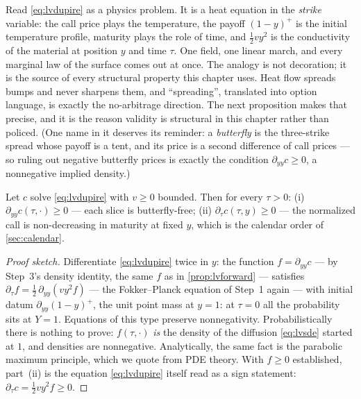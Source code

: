 Read \eqref{eq:lvdupire} as a physics problem.  It is a heat equation
in the \emph{strike} variable: the call price plays the temperature,
the payoff $(1-y)^{+}$ is the initial temperature profile, maturity
plays the role of time, and $\tfrac12 v y^{2}$ is the conductivity of
the material at position $y$ and time $\tau$.  One field, one linear
march, and every marginal law of the surface comes out at once.  The
analogy is not decoration; it is the source of every structural
property this chapter uses.  Heat flow spreads bumps and never sharpens
them, and ``spreading'', translated into option language, is exactly
the no-arbitrage direction.  The next proposition makes that precise,
and it is the reason validity is structural in this chapter rather
than policed.  (One name in it deserves its reminder: a
\emph{butterfly} is the three-strike spread whose payoff is a tent, and
its price is a second difference of call prices --- so ruling out
negative butterfly prices is exactly the condition
$\partial_{yy}c\ge0$, a nonnegative implied density.)

\begin{proposition}
\label{prop:lvpropagate}
Let $c$ solve \eqref{eq:lvdupire} with $v\ge0$ bounded.  Then for every
$\tau>0$: (i) $\partial_{yy}c(\tau,\cdot)\ge0$ --- each slice is
butterfly-free; (ii) $\partial_\tau c(\tau,y)\ge0$ --- the normalized
call is non-decreasing in maturity at fixed $y$, which is the calendar
order of \cref{sec:calendar}.
\end{proposition}

\begin{proof}[Proof sketch]
Differentiate \eqref{eq:lvdupire} twice in $y$: the function
$f=\partial_{yy}c$ --- by Step~3's density identity, the same $f$ as
in \cref{prop:lvforward} --- satisfies
$\partial_\tau f=\tfrac12\,\partial_{yy}(v y^{2}f)$ --- the
Fokker--Planck equation of Step~1 again --- with initial datum
$\partial_{yy}(1-y)^{+}$, the unit point mass at $y=1$: at $\tau=0$
all the probability sits at $Y=1$.  Equations of this type preserve
nonnegativity.  Probabilistically there is nothing to prove:
$f(\tau,\cdot)$ \emph{is} the density of the diffusion
\eqref{eq:lvsde} started at $1$, and densities are nonnegative.
Analytically, the same fact is the parabolic maximum principle,
which we quote from PDE theory.  With $f\ge0$ established, part~(ii)
is the equation \eqref{eq:lvdupire} itself read as a sign statement:
$\partial_\tau c=\tfrac12 v y^{2}f\ge0$.
\end{proof}

